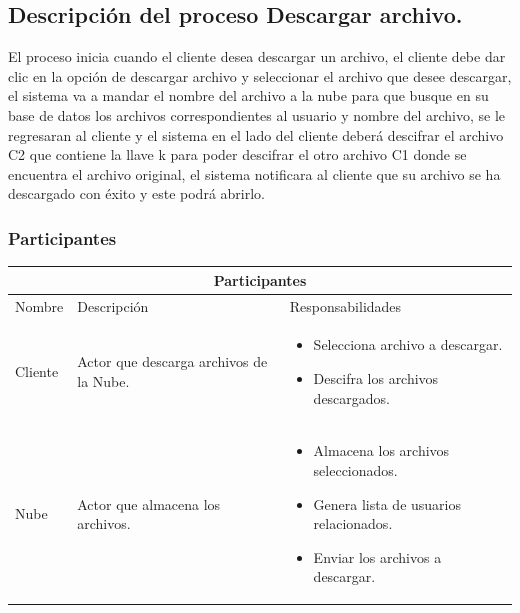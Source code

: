 \subsection{Descripción del proceso Descargar archivo.}

El proceso inicia cuando el cliente desea descargar un archivo, el cliente debe dar clic en la opción de descargar archivo y seleccionar el archivo que desee descargar, el sistema va a mandar el nombre del archivo a la nube para que busque en su base de datos los archivos correspondientes al usuario y nombre del archivo, se le regresaran al cliente y el sistema en el lado del cliente deberá descifrar el archivo C2 que contiene la llave k para poder descifrar el otro archivo C1 donde se encuentra el archivo original, el sistema notificara al cliente que su archivo se ha descargado con éxito y este podrá abrirlo. \\


\subsubsection{Participantes}

\begin{tabular}{ |p{2cm}|p{6cm}|p{6cm}|  }
\hline
\multicolumn{3}{|c|}{  Participantes  } \\
\hline

{ Nombre }  & { Descripción } & { Responsabilidades} \\
\hline
{ Cliente } &   Actor que descarga archivos de la Nube.  &  
			\begin{itemize}	
				\item Selecciona archivo a descargar.
				\item Descifra los archivos descargados.
			\end{itemize}   \\ 
\hline
{ Nube } &   Actor que almacena los archivos.  &  
			\begin{itemize}	
				\item Almacena los archivos seleccionados.
				\item Genera lista de usuarios relacionados.
				\item Enviar los archivos a descargar.
			\end{itemize}   \\ 
\hline
\end{tabular}

